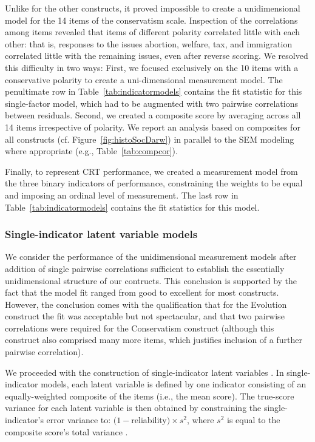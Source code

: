\documentclass[fignum,man]{apa}\usepackage[]{graphicx}\usepackage[]{color}
\begin{document}
Unlike for the other constructs, it proved impossible to create a unidimensional 
model for the 14 items of the conservatism scale. Inspection of the correlations among
items revealed that items of different polarity correlated little with each
other: that is, responses to the issues abortion, welfare, tax, and immigration
correlated little with the remaining issues, even after reverse scoring. 
We resolved this difficulty in two ways: First, we focused
exclusively on the 10 items
with a conservative polarity to create 
a uni-dimensional measurement model.
The penultimate row in Table~\ref{tab:indicatormodels} contains the
fit statistic for this single-factor model, which 
had to be augmented with two pairwise correlations between residuals.
Second, 
  we created a composite score by averaging across all 
  14 items irrespective of polarity. 
  We report an analysis based on composites for all constructs (cf. Figure~\ref{fig:histoSocDarw}) 
  in parallel to the SEM modeling where appropriate (e.g., Table~\ref{tab:compcor}).
  
Finally, to represent CRT performance, we created 
a measurement model from the three  
binary indicators of performance, 
constraining the weights to be equal and
imposing an ordinal level of measurement. 
The last row in Table~\ref{tab:indicatormodels} contains the
fit statistics for this model. 

\subsubsection{Single-indicator latent variable models}
We consider the performance of the unidimensional measurement models 
after addition of single pairwise
correlations sufficient to establish the essentially 
unidimensional structure
of our contructs. This conclusion is supported by the
fact that the model fit ranged from good to excellent \cite{Hooper08}
for most constructs. However, the conclusion 
 comes with the qualification that for the Evolution
construct the fit was acceptable but not spectacular, and that two pairwise
correlations were required for the Conservatism construct (although this construct
also comprised many more items, which justifies inclusion of a further pairwise correlation). 

We proceeded with the construction of
single-indicator latent variables \cite{Hayduk96,Joreskog82}.
In single-indicator models, each latent variable is defined 
by one indicator consisting of an equally-weighted composite 
of the items (i.e., the mean score).
The true-score variance for each latent variable is then obtained by 
constraining the single-indicator's error variance 
to: $(1 - $reliability$) \times s^2$, 
where $s^2$ is equal to the composite score's total variance \cite{Joreskog82}.
\end{document}

